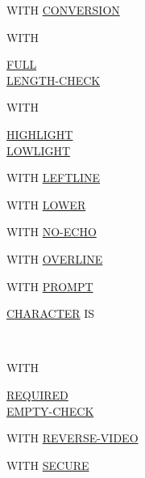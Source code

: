\documentclass[a4paper,oneside,svgnames]{scrbook}
\makeatletter
\newcommand{\key}[1]{\underline{#1}}
\newenvironment{0-1}{$\left[ \begin{tabular}{@{}l@{}}}{\end{tabular} \right]$}
\newenvironment{1=}{$\left\{ \begin{tabular}{@{}l@{}}}{\end{tabular} \right\}$}
\makeatother
\begin{document}
\begin{0-1}
WITH \key{CONVERSION}
\end{0-1}

\begin{0-1}
  WITH
  \begin{1=}
    \key{FULL} \\
    \key{LENGTH-CHECK} \\
  \end{1=}
\end{0-1}

\begin{0-1}
WITH
\begin{1=}
  \key{HIGHLIGHT} \\
  \key{LOWLIGHT}
\end{1=}
\end{0-1}

\begin{0-1}
WITH \key{LEFTLINE}
\end{0-1}

\begin{0-1}
WITH \key{LOWER}
\end{0-1}

\begin{0-1}
WITH \key{NO-ECHO}
\end{0-1}

\begin{0-1}
WITH \key{OVERLINE}
\end{0-1}

\begin{0-1}
  WITH \key{PROMPT}
  \begin{0-1}
    \key{CHARACTER} IS
    \begin{1=}
      \identifier \\
      \literal
    \end{1=}
  \end{0-1}
\end{0-1}

\begin{0-1}
  WITH
  \begin{1=}
    \key{REQUIRED} \\
    \key{EMPTY-CHECK}
  \end{1=}
\end{0-1}

\begin{0-1}
WITH \key{REVERSE-VIDEO}
\end{0-1}

\begin{0-1}
WITH \key{SECURE}
\end{0-1}
\end{document}
